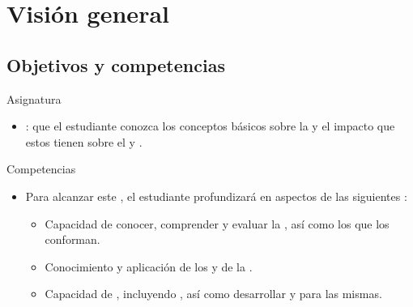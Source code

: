 \section{Visión general}

\subsection{Objetivos y competencias}

\begin{frame}[t]{Asignatura}
\begin{itemize}
  \item {}: que el estudiante conozca los conceptos básicos 
sobre la  y el impacto que estos tienen sobre 
el  y .

\end{itemize}
\end{frame}

\begin{frame}[t]{Competencias}
\begin{itemize}
  \item Para alcanzar este , el estudiante profundizará en aspectos de las siguientes :
    \begin{itemize}
      \item Capacidad de conocer, comprender y evaluar la 
            , 
            así como los  que los conforman.

      \item Conocimiento y aplicación de los  y 
             de la .

      \item Capacidad de  
            , 
            incluyendo , así como desarrollar 
            y  para las mismas.
    \end{itemize}
\end{itemize}
\end{frame}

